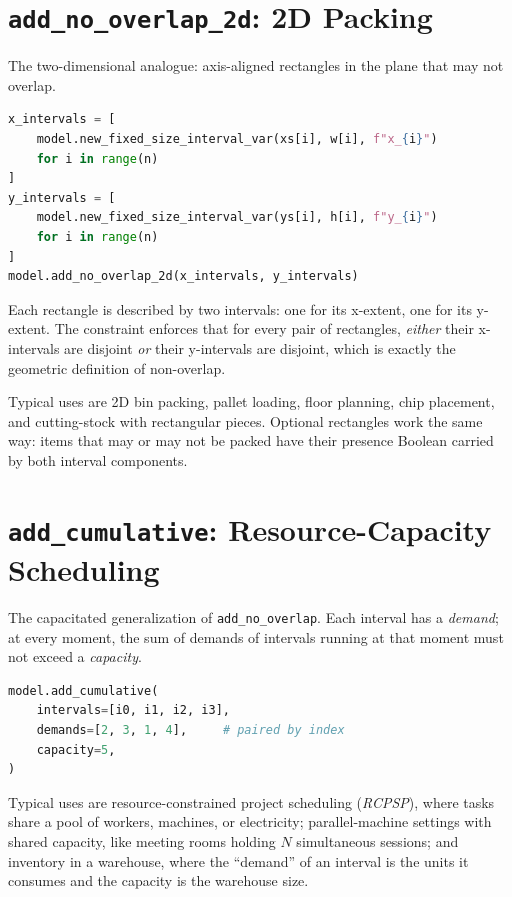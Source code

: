 \section{\texorpdfstring{\texttt{add\_no\_overlap\_2d}: 2D Packing}{add\_no\_overlap\_2d: 2D Packing}}\label{sec:7.8}

The two-dimensional analogue: axis-aligned rectangles in the plane that
may not overlap.

\begin{lstlisting}[language=Python]
x_intervals = [
    model.new_fixed_size_interval_var(xs[i], w[i], f"x_{i}")
    for i in range(n)
]
y_intervals = [
    model.new_fixed_size_interval_var(ys[i], h[i], f"y_{i}")
    for i in range(n)
]
model.add_no_overlap_2d(x_intervals, y_intervals)
\end{lstlisting}

Each rectangle is described by two intervals: one for its x-extent,
one for its y-extent. The constraint enforces that for every pair of
rectangles, \emph{either} their x-intervals are disjoint \emph{or} their
y-intervals are disjoint, which is exactly the geometric definition of
non-overlap.

Typical uses are 2D bin packing, pallet loading, floor planning, chip
placement, and cutting-stock with rectangular pieces. Optional
rectangles work the same way: items that may or may not be packed
have their presence Boolean carried by both interval components.

\section{\texorpdfstring{\texttt{add\_cumulative}: Resource-Capacity Scheduling}{add\_cumulative: Resource-Capacity Scheduling}}\label{sec:7.9}

The capacitated generalization of
\lstinline!add_no_overlap!. Each interval has a
\emph{demand}; at every moment, the sum of demands of intervals running
at that moment must not exceed a \emph{capacity}.

\begin{lstlisting}[language=Python]
model.add_cumulative(
    intervals=[i0, i1, i2, i3],
    demands=[2, 3, 1, 4],     # paired by index
    capacity=5,
)
\end{lstlisting}

Typical uses are resource-constrained project scheduling (\emph{RCPSP}),
where tasks share a pool of workers, machines, or electricity;
parallel-machine settings with shared capacity, like meeting rooms
holding \(N\) simultaneous sessions; and inventory in a warehouse, where
the ``demand'' of an interval is the units it consumes and the capacity
is the warehouse size.

